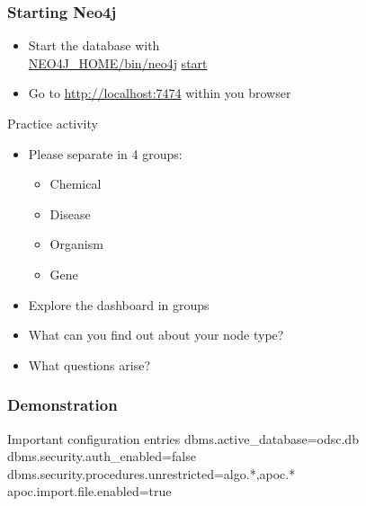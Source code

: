 \documentclass[12pt]{beamer}
\begin{document}
    \begin{frame}
        \frametitle{Starting Neo4j}
        \begin{itemize}
            \item Start the database with\\
            \textcolor{white}{\url{NEO4J_HOME/bin/neo4j} \url{start}}
            \pause
            \item Go to \textcolor{white}{\url{http://localhost:7474}} within you browser
        \end{itemize}
    \end{frame}
    
    \begin{frame}{Practice activity}
        \begin{itemize}
            \item Please separate in 4 groups:
            \begin{itemize}
                \item Chemical
                \item Disease
                \item Organism
                \item Gene
            \end{itemize}
            \pause
            \item Explore the dashboard in groups
            \item What can you find out about your node type?
            \item What questions arise?
        \end{itemize}
        
    \end{frame}
    
    \begin{frame}
        \frametitle{Demonstration}
        \begin{block}{Important configuration entries}
            dbms.active\_database=odsc.db\\
            dbms.security.auth\_enabled=false\\
            dbms.security.procedures.unrestricted=algo.*,apoc.*\\
            apoc.import.file.enabled=true
        \end{block}
    \end{frame}
    
\end{document}
